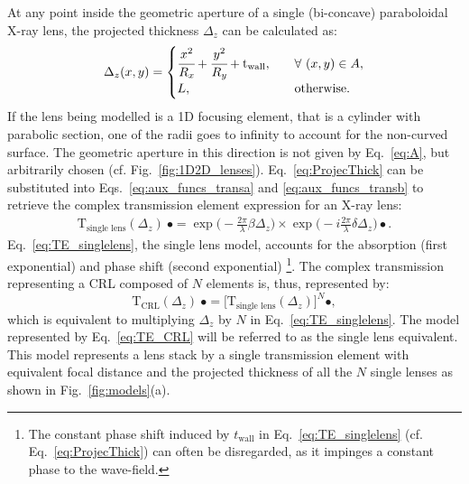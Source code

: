 \begin{refsection}
At any point inside the geometric aperture of a single (bi-concave) paraboloidal X-ray lens, the projected thickness $\Delta_z$ can be calculated as:
\begin{equation}\label{eq:ProjecThick}
    \Delta_z(x,y) = 
     \begin{cases}
      \cfrac{x^2}{R_x}+\cfrac{y^2}{R_y}+\text{t}_\text{wall}, &\quad\forall~(x,y) \in A,\\
      L, &\quad\text{otherwise}.
     \end{cases}
\end{equation}
If the lens being modelled is a 1D focusing element, that is a cylinder with parabolic section, one of the radii goes to infinity to account for the non-curved surface. The geometric aperture in this direction is not given by Eq.~\ref{eq:A}, but arbitrarily chosen (cf. Fig.~\ref{fig:1D2D_lenses}). Eq.~\ref{eq:ProjecThick} can be substituted into Eqs.~\ref{eq:aux_funcs_transa} and \ref{eq:aux_funcs_transb} to retrieve the complex transmission element expression for an X-ray lens:
\begin{eqnarray}\label{eq:TE_singlelens} %
    \mathrm{T}_{\text{single lens}}(\Delta_z)~\bullet =
    \exp{\bigg(-\frac{2\pi}{\lambda}\beta\Delta_z \bigg)}
    \times\exp{\bigg(-i\frac{2\pi}{\lambda}\delta\Delta_z \bigg)} \bullet.
\end{eqnarray}{}
Eq.~\ref{eq:TE_singlelens}, the single lens model, accounts for the absorption (first exponential) and phase shift (second exponential) \footnote{The constant phase shift induced by $t_\text{wall}$ in Eq.~\ref{eq:TE_singlelens} (cf. Eq.~\ref{eq:ProjecThick}) can often be disregarded, as it impinges a constant phase to the wave-field.}. The complex transmission representing a CRL composed of $N$ elements is, thus, represented by:
\begin{equation}\label{eq:TE_CRL}
    \mathrm{T}_{\text{CRL}}(\Delta_z)~\bullet = \big[\mathrm{T}_{\text{single lens}}(\Delta_z)\big]^{N} \bullet,
\end{equation}{}
which is equivalent to multiplying $\Delta_z$ by $N$ in Eq.~\ref{eq:TE_singlelens}. The model represented by Eq.~\ref{eq:TE_CRL} will be referred to as the single lens equivalent. This model represents a lens stack by a single transmission element with equivalent focal distance and the projected thickness of all the $N$ single lenses as shown in Fig.~\ref{fig:models}(a).


\end{refsection}
